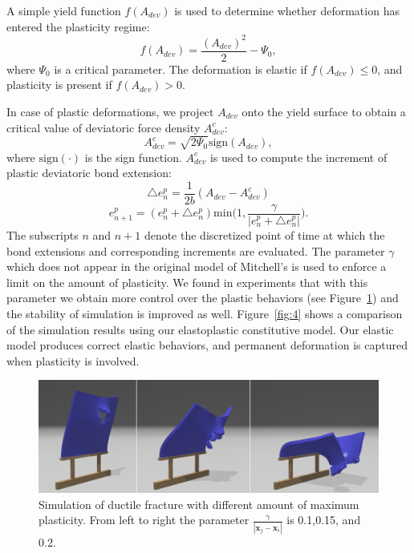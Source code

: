 A simple yield function $f(A_{dev})$ is used to determine whether deformation has entered the plasticity regime:
\begin{equation}
f(A_{dev}) = \frac{(A_{dev})^2}{2}-\Psi_0,
\label{eq:12}
\end{equation}
where $\Psi_0$ is a critical parameter. The deformation is elastic if $f(A_{dev})\leq 0$, and plasticity is present if  $f(A_{dev}) > 0$.

In case of plastic deformations, we project $A_{dev}$ onto the yield surface to obtain a critical value of deviatoric force density $A_{dev}^c$:
\begin{equation}
A_{dev}^c=\sqrt{2\Psi_0}\mathrm{sign}(A_{dev}),
\label{eq:13}
\end{equation}
where $\mathrm{sign}(\cdot)$ is the sign function. $A_{dev}^c$ is used to compute the increment of plastic deviatoric bond extension:
\begin{equation}
\triangle e_n^p = \frac{1}{2b}(A_{dev}-A_{dev}^c)
\label{eq:14}
\end{equation}
\begin{equation}
e_{n+1}^p = (e_n^p+\triangle e_n^p)\mathrm{min}\big(1,\frac{\gamma}{|e_n^p+\triangle e_n^p|}\big).
\label{eq:15}
\end{equation}
The subscripts $n$ and $n+1$ denote the discretized point of time at which the bond extensions and corresponding increments are evaluated. The parameter $\gamma$ which does not appear in the original model of Mitchell's \cite{mitchell2011nonlocal} is used to enforce a limit on the amount of plasticity. We found in experiments that with this parameter we obtain more control over the plastic behaviors (see Figure~\ref{fig:5}) and the stability of simulation is improved as well. Figure~\ref{fig:4} shows a comparison of the simulation results using our elastoplastic constitutive model. Our elastic model produces correct elastic behaviors, and permanent deformation is captured when plasticity is involved.
\begin{figure}[t]
  \centering
  \includegraphics[width=\linewidth]{../figs/demo_impact_upside_plastic_fracture.png}
  \caption{\label{fig:5}
  Simulation of ductile fracture with different amount of maximum plasticity. From left to right the parameter $\frac{\gamma}{|\mathbf{x}_j-\mathbf{x}_i|}$ is 0.1,0.15, and 0.2.
}
\end{figure}
